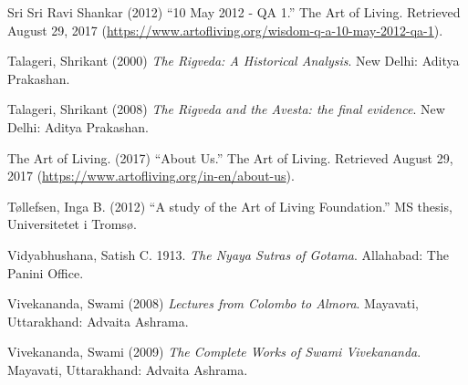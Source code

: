 \begin{thebibliography}{99}
  Sri Sri Ravi Shankar (2012) “10 May 2012 - QA 1.” The Art of Living. Retrieved August 29, 2017 (\url{https://www.artofliving.org/wisdom-q-a-10-may-2012-qa-1}).

  Talageri, Shrikant (2000) \textit{The Rigveda: A Historical Analysis}. New Delhi: Aditya Prakashan.

  Talageri, Shrikant (2008) \textit{The Rigveda and the Avesta: the final evidence}. New Delhi: Aditya Prakashan.

  The Art of Living. (2017) “About Us.” The Art of Living. Retrieved August 29, 2017 (\url{https://www.artofliving.org/in-en/about-us}).

  Tøllefsen, Inga B. (2012) “A study of the Art of Living Foundation.” MS thesis, Universitetet i Tromsø.

  Vidyabhushana, Satish C. 1913. \textit{The Nyaya Sutras of Gotama}. Allahabad: The Panini Office.

  Vivekananda, Swami (2008) \textit{Lectures from Colombo to Almora}. Mayavati, Uttarakhand: Advaita Ashrama.

  Vivekananda, Swami (2009) \textit{The Complete Works of Swami Vivekananda}. Mayavati, Uttarakhand: Advaita Ashrama.

 \end{thebibliography}

